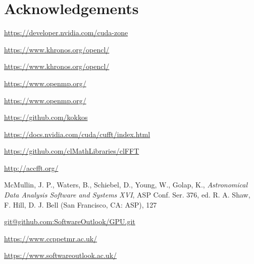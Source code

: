 \documentclass[12pt, a4paper]{article}
\begin{document}
\section{Acknowledgements}

\begin{thebibliography}{9}

\hyperlink{https://developer.nvidia.com/cuda-zone}{https://developer.nvidia.com/cuda-zone}

\hyperlink{https://www.khronos.org/opencl/}{https://www.khronos.org/opencl/}
  
\hyperlink{https://www.khronos.org/opencl/}{https://www.khronos.org/opencl/}

\hyperlink{https://www.openmp.org/}{https://www.openmp.org/}
  
\hyperlink{https://www.openmp.org/}{https://www.openmp.org/}

\hyperlink{https://github.com/kokkos}{https://github.com/kokkos}

\hyperlink{https://docs.nvidia.com/cuda/cufft/index.html}{https://docs.nvidia.com/cuda/cufft/index.html}

  \hyperlink{https://github.com/clMathLibraries/clFFT}{https://github.com/clMathLibraries/clFFT}
  
\hyperlink{http://accfft.org/}{http://accfft.org/}

McMullin, J. P., Waters, B., Schiebel, D., Young, W., Golap, K.,
{\it Astronomical Data Analysis Software and Systems XVI},
ASP Conf. Ser. 376, ed. R. A. Shaw, F. Hill, D. J. Bell (San Francisco, CA: ASP), 127

\hyperlink{git@github.com:SoftwareOutlook/GPU.git}{git@github.com:SoftwareOutlook/GPU.git}
    
\hyperlink{https://www.ccppetmr.ac.uk/}{https://www.ccppetmr.ac.uk/}

\hyperlink{https://www.softwareoutlook.ac.uk/}{https://www.softwareoutlook.ac.uk/}
  
\end{thebibliography}
\end{document}
